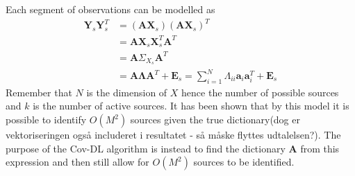 Each segment of observations can be modelled as
\begin{align}
\textbf{Y}_s\textbf{Y}_s^{T} &=(\textbf{A}\textbf{X}_s)(\textbf{A}\textbf{X}_s)^{T}\nonumber \\
&=\textbf{AX}_s\textbf{X}_s^T\textbf{A}^T \nonumber \\
&=\textbf{A}\Sigma_{{X}_s}\textbf{A}^T \nonumber\\
&=\mathbf{A} \boldsymbol{\Lambda} \mathbf{A}^T + \mathbf{E}_s = \sum_{i=1}^{N}\Lambda_{ii}\textbf{a}_i\textbf{a}_i^{T}+\textbf{E}_s\label{eq:cov_model}
 \end{align}
Remember that $N$ is the dimension of $X$ hence the number of possible sources and $k$ is the number of active sources.
It has been shown that by this model it is possible to identify $O(M^2)$ sources given the true dictionary\cite{Pal2015}(dog er vektoriseringen også includeret i resultatet - så måske flyttes udtalelsen?). The purpose of the Cov-DL algorithm is instead to find the dictionary $\textbf{A}$ from this expression and then still allow for $O(M^2)$ sources to be identified.

